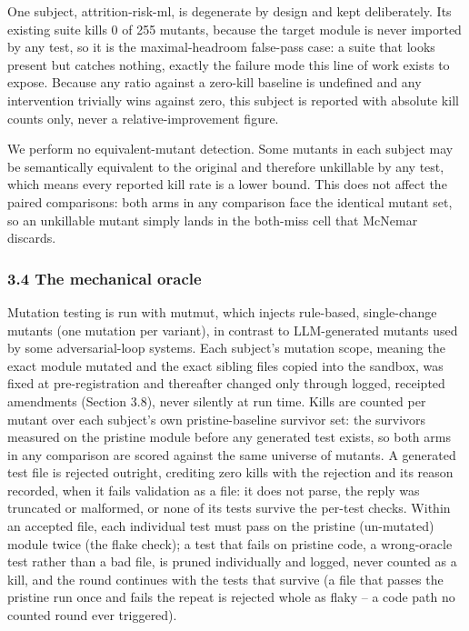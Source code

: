 \documentclass[
  11pt,
]{article}
\newcounter{none} %
\begin{document}
One subject, attrition-risk-ml, is degenerate by design and kept
deliberately. Its existing suite kills 0 of 255 mutants, because the
target module is never imported by any test, so it is the
maximal-headroom false-pass case: a suite that looks present but catches
nothing, exactly the failure mode this line of work exists to expose.
Because any ratio against a zero-kill baseline is undefined and any
intervention trivially wins against zero, this subject is reported with
absolute kill counts only, never a relative-improvement figure.

We perform no equivalent-mutant detection. Some mutants in each subject
may be semantically equivalent to the original and therefore unkillable
by any test, which means every reported kill rate is a lower bound. This
does not affect the paired comparisons: both arms in any comparison face
the identical mutant set, so an unkillable mutant simply lands in the
both-miss cell that McNemar discards.

\subsubsection{3.4 The mechanical oracle}\label{the-mechanical-oracle}

Mutation testing is run with mutmut, which injects rule-based,
single-change mutants (one mutation per variant), in contrast to
LLM-generated mutants used by some adversarial-loop systems. Each
subject's mutation scope, meaning the exact module mutated and the exact
sibling files copied into the sandbox, was fixed at pre-registration and
thereafter changed only through logged, receipted amendments (Section
3.8), never silently at run time. Kills are counted per mutant over each
subject's own pristine-baseline survivor set: the survivors measured on
the pristine module before any generated test exists, so both arms in
any comparison are scored against the same universe of mutants. A
generated test file is rejected outright, crediting zero kills with the
rejection and its reason recorded, when it fails validation as a file:
it does not parse, the reply was truncated or malformed, or none of its
tests survive the per-test checks. Within an accepted file, each
individual test must pass on the pristine (un-mutated) module twice (the
flake check); a test that fails on pristine code, a wrong-oracle test
rather than a bad file, is pruned individually and logged, never counted
as a kill, and the round continues with the tests that survive (a file
that passes the pristine run once and fails the repeat is rejected whole
as flaky -- a code path no counted round ever triggered).
\end{document}
